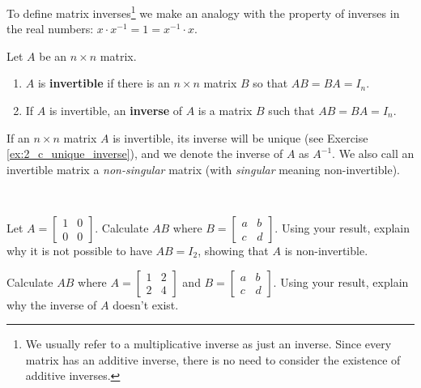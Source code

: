 To define matrix inverses\footnote{We usually refer to a multiplicative inverse as just an inverse. Since every matrix has an additive inverse, there is no need to consider the existence of additive inverses.} we make an analogy with the property of inverses in the real numbers: $x\cdot x^{-1}=1=x^{-1}\cdot x$. 



\begin{definition} Let $A$ be an $n \times n$ matrix.
\begin{enumerate}
\item $A$ is \textbf{invertible} if there is an $n \times n$ matrix $B$ so that $AB = BA = I_n$. 
\item If $A$ is invertible, an \textbf{inverse} of $A$ is a matrix $B$ such that $AB = BA = I_n$. 
\end{enumerate} 
\end{definition}



If an $n \times n$ matrix $A$ is invertible, its inverse will be unique (see Exercise \ref{ex:2_c_unique_inverse}), and we denote the inverse of $A$ as $A^{-1}$. We also call an invertible matrix a \emph{non-singular} matrix (with \emph{singular} meaning non-invertible). 



\begin{activity} \label{act:2_c_1} ~
	\ba
	\item Let $A = \left[ \begin{array}{cc} 1 & 0 \\ 0 & 0 \end{array} \right]$. Calculate $AB$ where $B = \left[ \begin{array}{cc} a&b \\ c&d \end{array} \right]$. Using your result, explain why it is not possible to have $AB=I_2$, showing that $A$ is non-invertible. 



\item Calculate $AB$ where $A = \left[ \begin{array}{cc} 1 & 2 \\ 2 & 4 \end{array} \right]$ and $B = \left[ \begin{array}{cc} a&b \\ c&d \end{array} \right]$. Using your result, explain why the inverse of $A$ doesn't exist.

	
	
	\ea
	
\end{activity}


